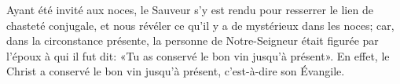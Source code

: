 Ayant été invité aux noces,
	le Sauveur s’y est rendu pour resserrer le lien de chasteté conjugale,
	et nous révéler ce qu’il y a de mystérieux dans les noces;
	car, dans la circonstance présente,
		la personne de Notre-Seigneur était figurée par l’époux à qui il fut dit:
	«Tu as conservé le bon vin jusqu’à présent».
En effet, le Christ a conservé le bon vin jusqu’à présent,
	c’est-à-dire son Évangile.
